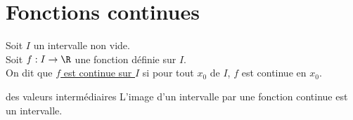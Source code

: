\documentclass[12pt,twoside,a4paper]{article}
\author{MPSI 2}
\begin{document}
	\maketitle
	\section{Fonctions continues}
		\begin{flushleft}
			Soit $I$ un intervalle non vide.\\
			Soit $f: I\rightarrow \R$ une fonction d\'efinie sur $I$.\\
			On dit que \underline{$f$ est continue sur $I$} si pour tout $x_0$ de $I$, $f$ est continue en $x_0$.
		\end{flushleft}
		\begin{theo}{des valeurs interm\'ediaires}
			L'image d'un intervalle par une fonction continue est un intervalle.
		\end{theo}
\end{document}

